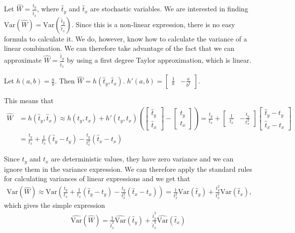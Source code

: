 \documentclass{article}
\begin{document}
\begin{example}
  Let \(\widehat{W} = \frac{\hat{t}_y}{\hat{t}_x}\), where \(\hat{t}_y\) and \(\hat{t}_x\) are stochastic variables. We
  are interested in finding \(\mathrm{Var} \left( \widehat{W} \right) = \mathrm{Var}
  \left( \frac{\hat{t}_y}{\hat{t}_x} \right)\).
  Since this is a non-linear expression, there is no easy formula to calculate
  it. We do, however, know how to calculate the variance of a linear
  combination. We can therefore take advantage of the fact that we can
  approximate \(\widehat{W} = \frac{\hat{t}_y}{\hat{t}_x}\) by using a first degree Taylor approximation,
  which is linear.

  Let \(h(a, b) = \frac{a}{b}\). Then \(\widehat{W} = h(\hat{t}_y, \hat{t}_x)\).
  \(h'(a, b) = \begin{bmatrix} \frac{1}{b} & -\frac{a}{b^2} \end{bmatrix}.\)

  This means that
  \begin{align*}
    \widehat{W} &= h(\hat{t}_y, \hat{t}_x)
    \approx h(t_y, t_x) + h'(t_y, t_x) \left( \begin{bmatrix} \hat{t}_y \\ \hat{t}_x \end{bmatrix}
    - \begin{bmatrix} t_y \\ t_x \end{bmatrix} \right)
    = \frac{t_y}{t_x} + \begin{bmatrix} \frac{1}{t_x} &
    -\frac{t_y}{t_x^2} \end{bmatrix} \begin{bmatrix} \hat{t}_y - t_y \\
      \hat{t}_x - t_x \end{bmatrix} \\
    &= \frac{t_y}{t_x} + \frac{1}{t_x} \left( \hat{t}_y - t_y \right) - \frac{t_y}{t_x^2} \left( \hat{t}_x - t_x \right)
    \end{align*}

    Since \(t_y\) and \(t_x\) are deterministic values, they have zero variance
    and we can ignore them in the variance expression. We can therefore apply
    the standard rules for calculating variances of linear expressions and we
    get that
    \begin{align*}
      \mathrm{Var} \left( \widehat{W} \right) \approx \mathrm{Var} \left(
      \frac{t_y}{t_x} + \frac{1}{t_x} \left( \hat{t}_y - t_y \right) -
      \frac{t_y}{t_x^2} \left( \hat{t}_x - t_x \right) \right)
    = \frac{1}{t_x^2} \mathrm{Var} \left( \hat{t}_y \right) +
      \frac{t_y^2}{t_x^4} \mathrm{Var} \left( \hat{t}_x \right),
      \end{align*}
      which gives the simple expression \begin{align*}
                    \widehat{\mathrm{Var}} \left( \widehat{W} \right) = \frac{1}{\hat{t}_x^2} \widehat{\mathrm{Var}} \left( \hat{t}_y \right) +
                    \frac{\hat{t}_y^2}{\hat{t}_x^4} \widehat{\mathrm{Var}} \left( \hat{t}_x \right)
                    \end{align*}


\end{example}
\end{document}
